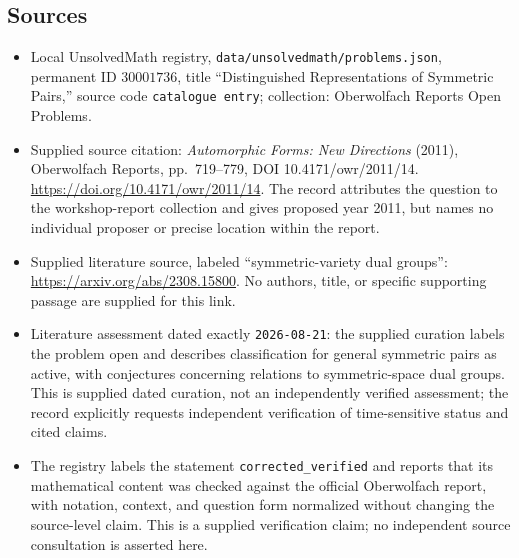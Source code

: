 \documentclass[11pt]{article}
\begin{document}
\subsection{Sources}
\begin{itemize}
\item Local UnsolvedMath registry, \texttt{data/unsolvedmath/problems.json}, permanent ID \(30001736\), title ``Distinguished Representations of Symmetric Pairs,'' source code \texttt{catalogue entry}; collection: Oberwolfach Reports Open Problems.
\item Supplied source citation: \emph{Automorphic Forms: New Directions} (2011), Oberwolfach Reports, pp.\ 719--779, DOI 10.4171/owr/2011/14. \url{https://doi.org/10.4171/owr/2011/14}. The record attributes the question to the workshop-report collection and gives proposed year 2011, but names no individual proposer or precise location within the report.
\item Supplied literature source, labeled ``symmetric-variety dual groups'': \url{https://arxiv.org/abs/2308.15800}. No authors, title, or specific supporting passage are supplied for this link.
\item Literature assessment dated exactly \texttt{2026-08-21}: the supplied curation labels the problem open and describes classification for general symmetric pairs as active, with conjectures concerning relations to symmetric-space dual groups. This is supplied dated curation, not an independently verified assessment; the record explicitly requests independent verification of time-sensitive status and cited claims.
\item The registry labels the statement \texttt{corrected\_verified} and reports that its mathematical content was checked against the official Oberwolfach report, with notation, context, and question form normalized without changing the source-level claim. This is a supplied verification claim; no independent source consultation is asserted here.
\end{itemize}
\end{document}
